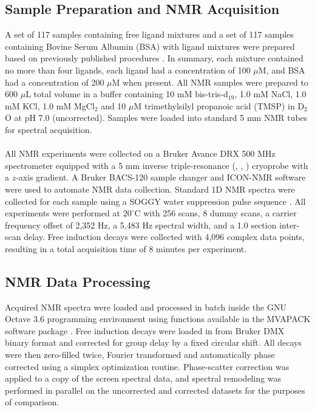 \subsection{Sample Preparation and NMR Acquisition}

\begin{doublespace}
A set of 117 samples containing free ligand mixtures and a set of 117 samples
containing Bovine Serum Albumin (BSA) with ligand mixtures were prepared based
on previously published procedures \cite{powers:ddt2008,mercier:cchts2009}.
In summary, each mixture contained no more than four ligands, each ligand had
a concentration of 100 $\mu$M, and BSA had a concentration of 200 $\mu$M when
present. All NMR samples were prepared to 600 $\mu$L total volume in a buffer
containing 10 mM bis-tris-d$_{19}$, 1.0 mM NaCl, 1.0 mM KCl, 1.0 mM MgCl$_2$
and 10 $\mu$M trimethylsilyl propanoic acid (TMSP) in D$_2$O at pH 7.0
(uncorrected). Samples were loaded into standard 5 mm NMR tubes for spectral
acquisition.
\\\\
All NMR experiments were collected on a Bruker Avance DRX 500 MHz spectrometer
equipped with a 5 mm inverse triple-resonance (\hnmr{}, \cnmr{}, \nnmr{})
cryoprobe with a $z$-axis gradient. A Bruker BACS-120 sample changer and
ICON-NMR software were used to automate NMR data collection. Standard 1D
\hnmr{} NMR spectra were collected for each sample using a SOGGY water
suppression pulse sequence \cite{hwang:jmr1995,nguyen:jmr2007}. All
experiments were performed at $20^\circ$C with 256 scans, 8 dummy scans,
a carrier frequency offset of 2,352 Hz, a 5,483 Hz spectral width, and a 1.0
section inter-scan delay. Free induction decays were collected with 4,096
complex data points, resulting in a total acquisition time of 8 minutes per
experiment.
\end{doublespace}

\subsection{NMR Data Processing}

\begin{doublespace}
Acquired NMR spectra were loaded and processed in batch inside the GNU Octave
3.6 programming environment \cite{eaton2008} using functions available in the
MVAPACK software package \cite{worley:acscb2014}. Free induction decays were
loaded in from Bruker DMX binary format and corrected for group delay by a
fixed circular shift. All decays were then zero-filled twice, Fourier
transformed and automatically phase corrected using a simplex optimization
routine. Phase-scatter correction was applied to a copy of the screen spectral
data, and spectral remodeling was performed in parallel on the uncorrected and
corrected datasets for the purposes of comparison.
\end{doublespace}


